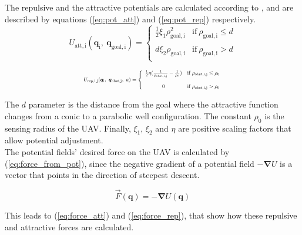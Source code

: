 \documentclass[journal]{IEEEtran}
\newcommand*{\subb}[1]{_{\mathrm{#1}}}
\begin{document}
		The repulsive and the attractive potentials are calculated according to \cite{potfieldsmethod}, and are described by equations (\ref{eq:pot_att}) and (\ref{eq:pot_rep}) respectively.
		\begin{equation} \label{eq:pot_att}
		U\subb{att, i}(\bm{q}\subb{i}, \ \bm{q}\subb{goal, i}) =  \left\lbrace  {\begin{array}{cc}
			\frac{1}{2} \xi\subb{1} \rho\subb{goal, i}^2& \textrm{if} \ \rho\subb{goal, i}\leq d \\
			\\
			d \xi\subb{2} \rho\subb{goal, i} &\textrm{if} \ \rho\subb{goal, i}> d \\
			\end{array} } \right.
		\end{equation}
		
		\begin{equation} \label{eq:pot_rep}
		\resizebox{0.5\textwidth}{!}{ $
		U\subb{rep, i,j}(\bm{q}\subb{i}, \ \bm{q}\subb{obst, j},\ a) =  \left\lbrace  {\begin{array}{cc}
			\frac{1}{2} \eta (\frac{1}{\rho\subb{obst,i,j}} - \frac{1}{\rho\subb{0}}) &\textrm{if} \ \rho\subb{obst,i,j}\leq \rho\subb{0} \\
			\\
			0 &\textrm{if} \ \rho\subb{obst,i,j}> \rho\subb{0} \\
			\end{array} } \right. $}
		\end{equation}		
		
		The $d$ parameter is the distance from the goal where the attractive function changes from a conic to a parabolic well configuration. The constant $\rho\subb{0}$ is the sensing radius of the UAV. Finally, $\xi\subb{1}$, $\xi\subb{2}$ and $\eta$ are positive scaling factors that allow potential adjustment. \\
		
		The potential fields' desired force on the UAV is calculated by (\ref{eq:force_from_pot}), since the negative gradient of a potential field $-\bm{\nabla} U$ is a vector that points in the direction of steepest descent. 
		
		\begin{equation} \label{eq:force_from_pot}
		\vec{F}(\bm{q}) = - \bm{\nabla} U(\bm{q})
		\end{equation}
		
		This leads to (\ref{eq:force_att}) and (\ref{eq:force_rep}), that show how these repulsive and attractive forces are calculated.
		
\end{document}
